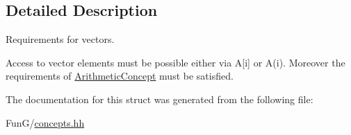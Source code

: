 \subsection{Detailed Description}
Requirements for vectors. 

Access to vector elements must be possible either via A\mbox{[}i\mbox{]} or A(i). Moreover the requirements of \hyperlink{structFunG_1_1Concepts_1_1ArithmeticConcept}{Arithmetic\-Concept} must be satisfied. 

The documentation for this struct was generated from the following file\-:\begin{DoxyCompactItemize}
\item 
Fun\-G/\hyperlink{concepts_8hh}{concepts.\-hh}\end{DoxyCompactItemize}
